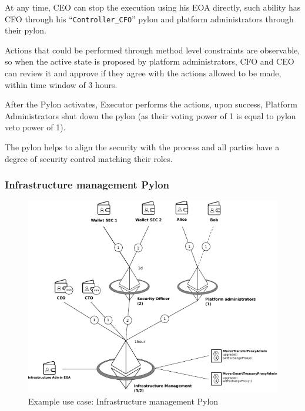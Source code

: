 \documentclass[12pt]{article}
\begin{document}
At any time, CEO can stop the execution using his EOA directly, such ability has CFO through his ``\texttt{Controller\_CFO}'' pylon and platform administrators through their pylon.

Actions that could be performed through method level constraints are observable, so when the active state is proposed by platform administrators, CFO and CEO can review it and approve if they agree with the actions allowed to be made, within time window of 3 hours.

After the Pylon activates, Executor performs the actions, upon success, Platform Administrators shut down the pylon (as their voting power of 1 is equal to pylon veto power of 1).

The pylon helps to align the security with the process and all parties have a degree of security control matching their roles.

\pagebreak
\subsubsection{Infrastructure management Pylon}

\begin{figure}[h!]
  \hspace*{-1cm}
    \includegraphics[width=1.25\textwidth]{pylon_example_infrastructure.pdf}
    \caption[Figure 1]{Example use case: Infrastructure management Pylon\label{fig:pylon_example_infrastructure}}
\end{figure}
\end{document}
